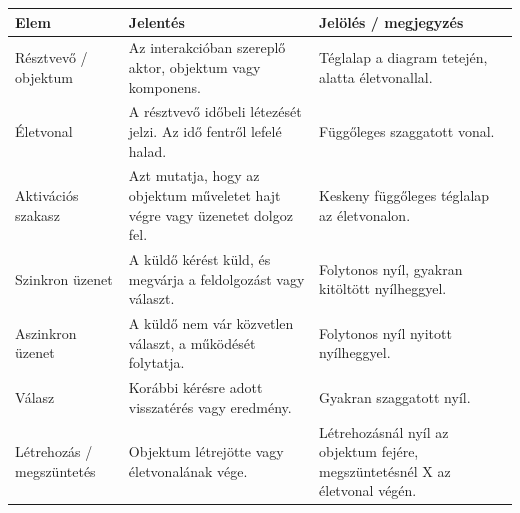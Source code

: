 \begin{tabularx}{\textwidth}{L{34mm}X X}
\toprule
\textbf{Elem} & \textbf{Jelentés} & \textbf{Jelölés / megjegyzés} \\
\midrule
Résztvevő / objektum & Az interakcióban szereplő aktor, objektum vagy komponens. & Téglalap a diagram tetején, alatta életvonallal. \\
Életvonal & A résztvevő időbeli létezését jelzi. Az idő fentről lefelé halad. & Függőleges szaggatott vonal. \\
Aktivációs szakasz & Azt mutatja, hogy az objektum műveletet hajt végre vagy üzenetet dolgoz fel. & Keskeny függőleges téglalap az életvonalon. \\
Szinkron üzenet & A küldő kérést küld, és megvárja a feldolgozást vagy választ. & Folytonos nyíl, gyakran kitöltött nyílheggyel. \\
Aszinkron üzenet & A küldő nem vár közvetlen választ, a működését folytatja. & Folytonos nyíl nyitott nyílheggyel. \\
Válasz & Korábbi kérésre adott visszatérés vagy eredmény. & Gyakran szaggatott nyíl. \\
Létrehozás / megszüntetés & Objektum létrejötte vagy életvonalának vége. & Létrehozásnál nyíl az objektum fejére, megszüntetésnél X az életvonal végén. \\
\bottomrule
\end{tabularx}

